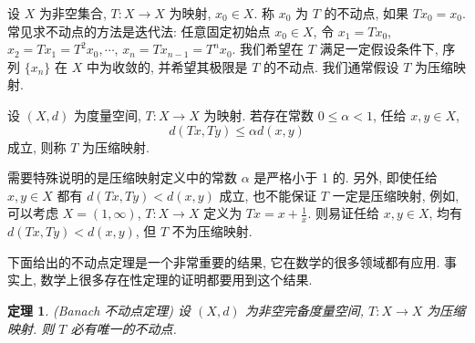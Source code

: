 \documentclass[openany]{ctexbook}
\theoremstyle{kaiti}
\newtheorem{theorem}{定理}[section]
\theoremstyle{normal}
\begin{document}
设 $X$ 为非空集合, $T: X \rightarrow X$ 为映射, $x_0 \in X$. 称 $x_0$ 为 $T$ 的不动点, 如果 $T x_0=x_0$. 常见求不动点的方法是迭代法: 任意固定初始点 $x_0 \in X$, 令 $x_1=T x_0$, $x_2=T x_1=T^2 x_0, \cdots$, $x_n=T x_{n-1}=T^n x_0$. 我们希望在 $T$ 满足一定假设条件下, 序列 $\{x_n\}$ 在 $X$ 中为收敛的, 并希望其极限是 $T$ 的不动点. 我们通常假设 $T$ 为压缩映射.

设 $(X, d)$ 为度量空间, $T: X \rightarrow X$ 为映射. 若存在常数 $0 \leqslant \alpha<1$, 任给 $x, y \in X$,
\begin{equation}
  d(Tx, Ty) \leqslant \alpha d(x, y)
\end{equation}
成立, 则称 $T$ 为压缩映射.

需要特殊说明的是压缩映射定义中的常数 $\alpha$ 是严格小于 1 的. 另外, 即使任给 $x, y \in X$ 都有 $d(T x, T y)<d(x, y)$ 成立, 也不能保证 $T$ 一定是压缩映射, 例如, 可以考虑 $X=(1, \infty)$, $T: X \rightarrow X$ 定义为 $T x=x+\frac{1}{x}$. 则易证任给 $x, y \in X$, 均有 $d(Tx, Ty)<d(x,y)$, 但 $T$ 不为压缩映射.

下面给出的不动点定理是一个非常重要的结果, 它在数学的很多领域都有应用. 事实上, 数学上很多存在性定理的证明都要用到这个结果.

\begin{theorem}
  (Banach 不动点定理) 设 $(X, d)$ 为非空完备度量空间, $T: X \rightarrow X$ 为压缩映射. 则 $T$ 必有唯一的不动点.
\end{theorem}
\end{document}
